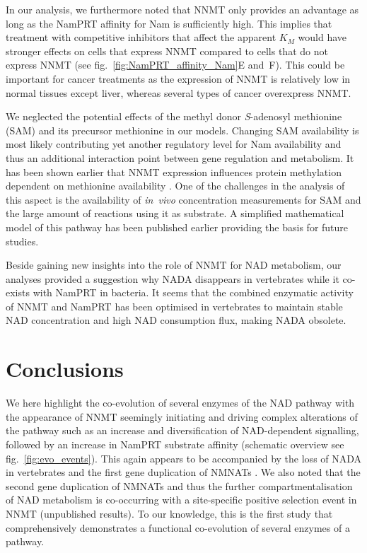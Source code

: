 In our analysis, we furthermore noted that NNMT only provides an advantage as long as the NamPRT affinity for Nam is sufficiently high. This implies that treatment with competitive inhibitors that affect the apparent $K_{M}$ would have stronger effects on cells that express NNMT compared to cells that do not express NNMT (see fig.~\ref{fig:NamPRT_affinity_Nam}E and~F). This could be important for cancer treatments as the expression of NNMT is relatively low in normal tissues except liver, whereas several types of cancer overexpress NNMT.

We neglected the potential effects of the methyl donor \textit{S}-adenosyl methionine (SAM) and its precursor methionine in our models. Changing SAM availability is most likely contributing yet another regulatory level for Nam availability and thus an additional interaction point between gene regulation and metabolism. It has been shown earlier that NNMT expression influences protein methylation dependent on methionine availability \cite{Ulanovskaya2013}. One of the challenges in the analysis of this aspect is the availability of \textit{in~vivo} concentration measurements for SAM and the large amount of reactions using it as substrate. A simplified mathematical model of this pathway has been published earlier \cite{Reed2004} providing the basis for future studies.

Beside gaining new insights into the role of NNMT for NAD metabolism, our analyses provided a suggestion why NADA disappears in vertebrates while it co-exists with NamPRT in bacteria. It seems that the combined enzymatic activity of NNMT and NamPRT has been optimised in vertebrates to maintain stable NAD concentration and high NAD consumption flux, making NADA obsolete.


\section{Conclusions}

We here highlight the co-evolution of several enzymes of the NAD pathway with the appearance of NNMT seemingly initiating and driving complex alterations of the pathway such as an increase and diversification of NAD-dependent signalling, followed by an increase in NamPRT substrate affinity (schematic overview see fig.~\ref{fig:evo_events}). This again appears to be accompanied by the loss of NADA in vertebrates and the first gene duplication of NMNATs \cite{Lau2010}. We also noted that the second gene duplication of NMNATs and thus the further compartmentalisation of NAD metabolism is co-occurring with a site-specific positive selection event in NNMT (unpublished results). To our knowledge, this is the first study that comprehensively demonstrates a functional co-evolution of several enzymes of a pathway.

